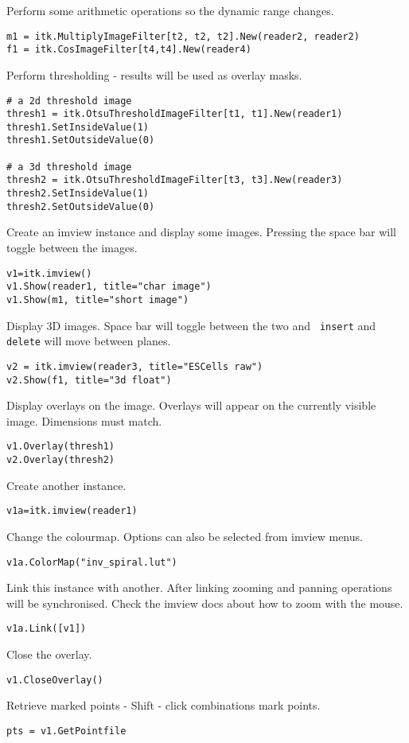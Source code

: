 \documentclass{InsightArticle}
\begin{document}
Perform some arithmetic operations so the dynamic range changes.
\begin{verbatim}
m1 = itk.MultiplyImageFilter[t2, t2, t2].New(reader2, reader2)
f1 = itk.CosImageFilter[t4,t4].New(reader4)
\end{verbatim}

Perform thresholding - results will be used as overlay masks.
\begin{verbatim}
# a 2d threshold image
thresh1 = itk.OtsuThresholdImageFilter[t1, t1].New(reader1)
thresh1.SetInsideValue(1)
thresh1.SetOutsideValue(0)

# a 3d threshold image
thresh2 = itk.OtsuThresholdImageFilter[t3, t3].New(reader3)
thresh2.SetInsideValue(1)
thresh2.SetOutsideValue(0)
\end{verbatim}

Create an imview instance and display some images. Pressing the space
bar will toggle between the images.
\begin{verbatim}
v1=itk.imview()
v1.Show(reader1, title="char image")
v1.Show(m1, title="short image")
\end{verbatim}

Display 3D images. Space bar will toggle between the two and {\tt
insert} and {\tt delete} will move between planes.
\begin{verbatim}
v2 = itk.imview(reader3, title="ESCells raw")
v2.Show(f1, title="3d float")
\end{verbatim}

Display overlays on the image. Overlays will appear on the currently
visible image. Dimensions must match.
\begin{verbatim}
v1.Overlay(thresh1)
v2.Overlay(thresh2)
\end{verbatim}

Create another instance.
\begin{verbatim}
v1a=itk.imview(reader1)
\end{verbatim}

Change the colourmap. Options can also be selected from imview menus.
\begin{verbatim}
v1a.ColorMap("inv_spiral.lut")
\end{verbatim}

Link this instance with another. After linking zooming and panning
operations will be synchronised. Check the imview docs about how to
zoom with the mouse.
\begin{verbatim}
v1a.Link([v1])
\end{verbatim}
Close the overlay.
\begin{verbatim}
v1.CloseOverlay()
\end{verbatim}

Retrieve marked points - Shift - click combinations mark points.
\begin{verbatim}
pts = v1.GetPointfile
\end{verbatim}


\appendix





\nocite{ITKSoftwareGuide}
\end{document}

